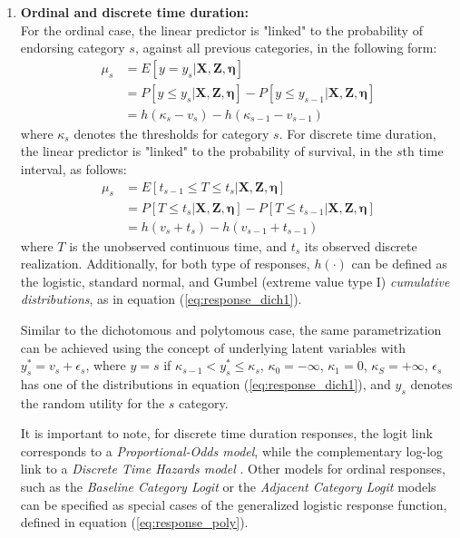 \begin{enumerate}
	\item \textbf{Ordinal and discrete time duration:} \\
	For the ordinal case, the linear predictor is "linked" to the probability of endorsing category $s$, against all previous categories, in the following form:
	\begin{equation} \label{eq:link_ord1}
		\begin{split}
			\mu_{s} &= E[y = y_{s} | \mathbf{X}, \mathbf{Z}, \pmb{\eta}] \\
			&= P[y \leq y_{s} | \mathbf{X}, \mathbf{Z}, \pmb{\eta}] - P[y \leq y_{s-1} | \mathbf{X}, \mathbf{Z}, \pmb{\eta}] \\
			&= h(\kappa_{s} - v_{s}) - h(\kappa_{s-1} - v_{s-1})
		\end{split}
	\end{equation}
	where $\kappa_{s}$ denotes the thresholds for category $s$. For discrete time duration, the linear predictor is "linked" to the probability of survival, in the $s$th time interval, as follows:
	\begin{equation} \label{eq:link_ord2}
		\begin{split}
			\mu_{s} &= E[t_{s-1} \leq T \le t_{s} | \mathbf{X}, \mathbf{Z}, \pmb{\eta}] \\
			&= P[T \leq t_{s} | \mathbf{X}, \mathbf{Z}, \pmb{\eta}] - P[T \leq t_{s-1} | \mathbf{X}, \mathbf{Z}, \pmb{\eta}] \\
			&= h(v_{s} + t_{s}) - h(v_{s-1} + t_{s-1})
		\end{split}
	\end{equation}
	where $T$ is the unobserved continuous time, and $t_{s}$ its observed discrete realization. Additionally, for both type of responses, $h(\cdot)$ can be defined as the logistic, standard normal, and Gumbel (extreme value type I) \textit{cumulative distributions}, as in equation (\ref{eq:response_dich1}).
	
	Similar to the dichotomous and polytomous case, the same parametrization can be achieved using the concept of underlying latent variables with $y_{s}^{*} = v_{s} + \epsilon_{s}$, where $y = s$ if $\kappa_{s-1} < y_{s}^{*} \le \kappa_{s}$, $\kappa_{0}=-\infty$, $\kappa_{1}=0$, $\kappa_{S}=+\infty$, $\epsilon_{s}$ has one of the distributions in equation (\ref{eq:response_dich1}), and $y_{s}$ denotes the random utility for the $s$ category.
	
	It is important to note, for discrete time duration responses, the logit link corresponds to a \textit{Proportional-Odds model}, while the complementary log-log link to a \textit{Discrete Time Hazards model} \citep{Rabe_et_al_2001}. Other models for ordinal responses, such as the \textit{Baseline Category Logit} or the \textit{Adjacent Category Logit} models can be specified as special cases of the generalized logistic response function, defined in equation (\ref{eq:response_poly}). 
	

\end{enumerate}

